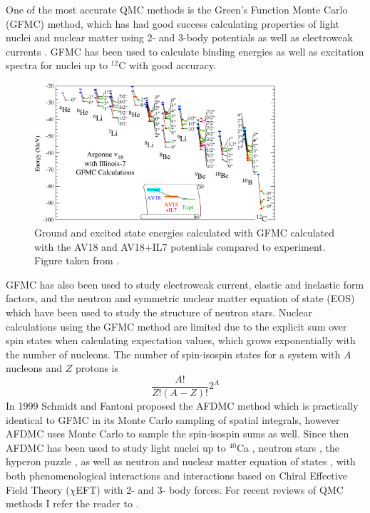 One of the most accurate QMC methods is the Green's Function Monte Carlo (GFMC) method, which has had good success calculating properties of light nuclei and nuclear matter using 2- and 3-body potentials as well as electroweak currents \cite{carlson2015}. GFMC has been used to calculate binding energies as well as excitation spectra for nuclei up to $^{12}$C with good accuracy.
\begin{figure}[h!]
   \centering
   \includegraphics[width=0.8\textwidth]{figures/gfmc_energies.png}
   \caption{Ground and excited state energies calculated with GFMC calculated with the AV18 and AV18+IL7 potentials compared to experiment. Figure taken from \cite{carlson2015}.}
   \label{fig:energy_jaslin}
\end{figure}
GFMC has also been used to study electroweak current, elastic and inelastic form factors, and the neutron and symmetric nuclear matter equation of state (EOS) which have been used to study the structure of neutron stars. Nuclear calculations using the GFMC method are limited due to the explicit sum over spin states when calculating expectation values, which grows exponentially with the number of nucleons. The number of spin-isospin states for a system with $A$ nucleons and $Z$ protons is
\begin{equation}
   \frac{A!}{Z!(A-Z)!}2^A
\end{equation}
In 1999 Schmidt and Fantoni \cite{schmidt1999} proposed the AFDMC method which is practically identical to GFMC in its Monte Carlo sampling of spatial integrals, however AFDMC uses Monte Carlo to sample the spin-isospin sums as well. Since then AFDMC has been used to study light nuclei up to $^{40}$Ca \cite{gandolfi2007,lonardoni2017}, neutron stars \cite{gandolfi2014_2,gandolfi2012,tews2018}, the hyperon puzzle \cite{lonardoni2015,gandolfi2017_2}, as well as neutron and nuclear matter equation of states \cite{gandolfi2007_2,gandolfi2014,tews2018}, with both phenomenological interactions and interactions based on Chiral Effective Field Theory ($\chi$EFT) \cite{lonardoni2018_3,lonardoni2018} with 2- and 3- body forces. For recent reviews of QMC methods I refer the reader to \cite{carlson2015,lynn2019}.

